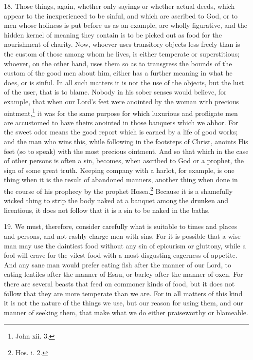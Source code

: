 18. Those things, again, whether only sayings or whether actual deeds, which appear to the inexperienced to be sinful, and which are ascribed to God, or to men whose holiness is  put before us as an example, are wholly figurative, and the hidden kernel of meaning they contain is to be picked out as food for the nourishment of charity. Now, whoever uses transitory objects less freely than is the custom of those among whom he lives, is either temperate or superstitious; whoever, on the other hand, uses them so as to transgress the bounds of the custom of the good men about him, either has a further meaning in what he does, or is sinful. In all such matters it is not the use of the objects, but the lust of the user, that is to blame. Nobody in his sober senses would believe, for example, that when our Lord’s feet were anointed by the woman with precious ointment,\footnote{John xii. 3.} it was for the same purpose for which luxurious and profligate men are accustomed to have theirs anointed in those banquets which we abhor. For the sweet odor means the good report which is earned by a life of good works; and the man who wins this, while following in the footsteps of Christ, anoints His feet (so to speak) with the most precious ointment. And so that which in the case of other persons is often a sin, becomes, when ascribed to God or a prophet, the sign of some great truth. Keeping company with a harlot, for example, is one thing when it is the result of abandoned manners, another thing when done in the course of his prophecy by the prophet Hosea.\footnote{Hos. i. 2.} Because it is a shamefully wicked thing to strip the body naked at a banquet among the drunken and licentious, it does not follow that it is a sin to be naked in the baths.

19. We must, therefore, consider carefully what is suitable to times and places and persons, and not rashly charge men with sins. For it is possible that a wise man may use the daintiest food without any sin of epicurism or gluttony, while a fool will crave for the vilest food with a most disgusting eagerness of appetite. And any sane man would prefer eating fish after the manner of our Lord, to eating lentiles after the manner of Esau, or barley after the manner of oxen. For there are several beasts that feed on commoner kinds of food, but it does not follow that they are more temperate than we are. For in all matters of this kind it is not the nature of the things we use, but our reason for using them, and our manner of seeking them, that make what we do either praiseworthy or blameable.

